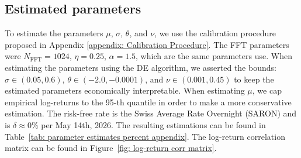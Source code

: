 \subsection{Estimated parameters}
To estimate the parameters $\mu$, $\sigma$, $\theta$, and $\nu$, we use the calibration procedure proposed in Appendix \ref{appendix: Calibration Procedure}. The FFT parameters were $N_{\text{FFT}}=1024$, $\eta=0.25$, $\alpha=1.5$, which are the same parameters \textcite{carr1999option} use. When estimating the parameters using the DE algorithm, we asserted the bounds: $\sigma \in (0.05,0.6)$, $\theta \in (-2.0, -0.0001)$, and $\nu \in (0.001, 0.45)$ to keep the estimated parameters economically interpretable. When estimating $\mu$, we cap empirical log-returns to the 95-th quantile in order to make a more conservative estimation. The risk-free rate is the Swiss Average Rate Overnight (SARON) and is $\delta\approx 0\%$ per May 14th, 2026. The resulting estimations can be found in Table~\ref{tab: parameter estimates percent appendix}. The log-return correlation matrix can be found in Figure~\ref{fig: log-return corr matrix}.

